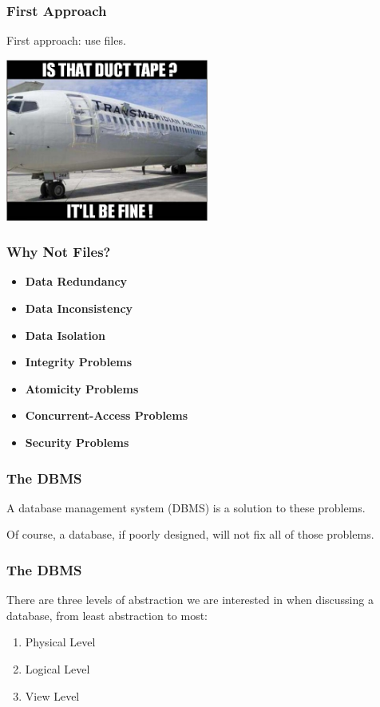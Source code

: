\begin{frame}
\frametitle{First Approach}

First approach: use files.

\begin{center}
	\includegraphics[width=0.5\textwidth]{images/ducttape.jpg}
\end{center}

\end{frame}


\begin{frame}
\frametitle{Why Not Files?}
\begin{itemize}
	\item \textbf{Data Redundancy}
	\item \textbf{Data Inconsistency}
	\item \textbf{Data Isolation}
	\item \textbf{Integrity Problems}
	\item \textbf{Atomicity Problems}
	\item \textbf{Concurrent-Access Problems}
	\item \textbf{Security Problems}
\end{itemize}
\end{frame}



\begin{frame}
\frametitle{The DBMS}

A database management system (DBMS) is a solution to these problems. 

Of course, a database, if poorly designed, will not fix all of those problems. 

\end{frame}



\begin{frame}
\frametitle{The DBMS}

There are three levels of abstraction we are interested in when discussing a database, from least abstraction to most:

\begin{enumerate}
	\item Physical Level
	\item Logical Level
	\item View Level
\end{enumerate}

\end{frame}



